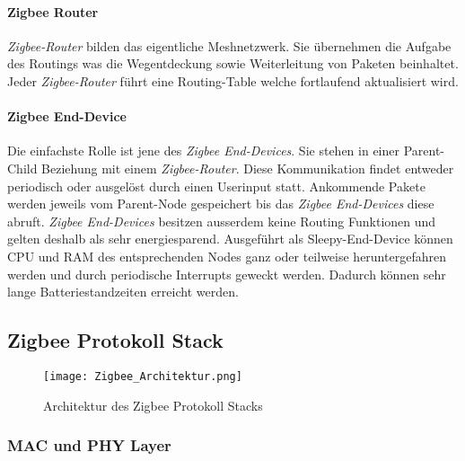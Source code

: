 \paragraph{Zigbee Router}\label{par:ZigbeeRouter}
\textit{Zigbee-Router} bilden das eigentliche Meshnetzwerk. Sie übernehmen die Aufgabe des Routings was die Wegentdeckung sowie Weiterleitung von Paketen beinhaltet. Jeder \textit{Zigbee-Router} führt eine Routing-Table welche fortlaufend aktualisiert wird.

\paragraph{Zigbee End-Device}\label{par:ZigbeeEndDevice}
Die einfachste Rolle ist jene des \textit{Zigbee End-Devices}. Sie stehen in einer Parent-Child Beziehung mit einem \textit{Zigbee-Router}.
Diese Kommunikation findet entweder periodisch oder ausgelöst durch einen Userinput statt.
Ankommende Pakete werden jeweils vom Parent-Node gespeichert bis das  \textit{Zigbee End-Devices} diese abruft.
\textit{Zigbee End-Devices} besitzen ausserdem keine Routing Funktionen und gelten deshalb als sehr energiesparend.
Ausgeführt als Sleepy-End-Device können CPU und RAM des entsprechenden Nodes ganz oder teilweise heruntergefahren werden und durch periodische Interrupts geweckt werden.
Dadurch können sehr lange Batteriestandzeiten erreicht werden. \cite{markus_krause_rainer_konrad_drahtlose_2014}





\subsection{Zigbee Protokoll Stack}\label{subsec:ZigbeeProtokollStack}



\begin{figure}[h]
	\centering
	\texttt{[image: Zigbee\_Architektur.png]}
	\caption{Architektur des Zigbee Protokoll Stacks \cite{markus_krause_rainer_konrad_drahtlose_2014}}
	\label{fig:ArchitekturdesZigbeeProtokollStacks}
\end{figure}

\subsubsection{MAC und PHY Layer}\label{subsubsec:MACundPHYLayer}

